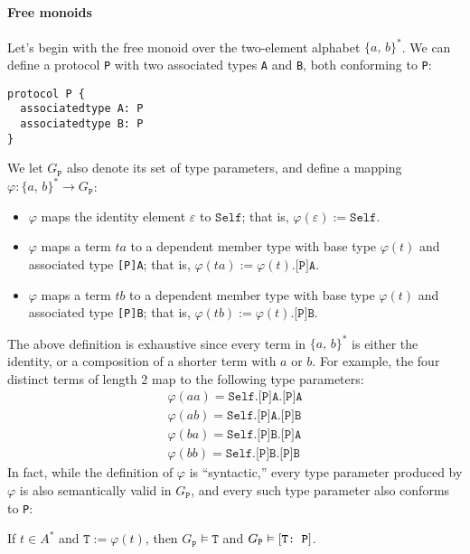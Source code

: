 \documentclass[../generics]{subfiles}
\begin{document}
\paragraph{Free monoids} Let's begin with the free monoid over the two-element alphabet $\{a,\,b\}^*$. We can define a protocol \texttt{P} with two associated types \texttt{A} and \texttt{B}, both conforming to \texttt{P}:
\begin{Verbatim}
protocol P {
  associatedtype A: P
  associatedtype B: P
}
\end{Verbatim}
We let $G_\texttt{P}$ also denote its set of type parameters, and define a mapping $\varphi\colon\{a,\,b\}^*\rightarrow G_\texttt{P}$:
\begin{itemize}
\item $\varphi$ maps the identity element $\varepsilon$ to $\texttt{Self}$; that is, $\varphi(\varepsilon):=\texttt{Self}$.
\item $\varphi$ maps a term $ta$ to a dependent member type with base type $\varphi(t)$ and associated type \texttt{[P]A}; that is, $\varphi(ta):=\texttt{$\varphi(t)$.[P]A}$.
\item $\varphi$ maps a term $tb$ to a dependent member type with base type $\varphi(t)$ and associated type \texttt{[P]B}; that is, $\varphi(tb):=\texttt{$\varphi(t)$.[P]B}$.
\end{itemize}
The above definition is exhaustive since every term in $\{a,\,b\}^*$ is either the identity, or a composition of a shorter term with $a$ or $b$. For example, the four distinct terms of length 2 map to the following type parameters:
\begin{gather*}
\varphi(aa)=\texttt{Self.[P]A.[P]A}\\
\varphi(ab)=\texttt{Self.[P]A.[P]B}\\
\varphi(ba)=\texttt{Self.[P]B.[P]A}\\
\varphi(bb)=\texttt{Self.[P]B.[P]B}
\end{gather*}
In fact, while the definition of $\varphi$ is ``syntactic,'' every type parameter produced by $\varphi$ is also semantically valid in $G_\texttt{P}$, and every such type parameter also conforms to \texttt{P}:
\begin{proposition}\label{monoid type lemma} If $t\in A^*$ and $\texttt{T}:=\varphi(t)$, then $G_\texttt{P}\vDash\texttt{T}$ and $G_\texttt{P}\vDash[\texttt{T:~P}]$.
\end{proposition}
\end{document}
